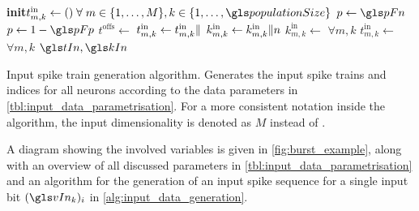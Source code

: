 \begin{algorithm}
	\small
	\begin{shaded}
		\begin{algorithmic}[1]
			\newcommand{\To}{\textbf{to}\xspace}
			\newcommand{\Init}{\State\textbf{init}\xspace}
				\Init $t^{\mathrm{in}}_{m, k} \gets () \; \forall \; m \in \{1, \ldots, M\}, k \in \{1, \ldots, \populationSize\}$
				\For{$n \gets 1$ \To $\nSamples$} 
					\For{$m \gets 1$ \To $\dimIn$} 
						 
							\State $p \gets \pFn$
						\Else
							\State $p \gets 1 - \pFp$
						\EndIf
						\For{$k \gets 1$ \To $\populationSize$} 
							\State $t^\mathrm{offs} \gets $  
							\For{$\ell \gets 1$ \To $\burstSizeIn$} 
								\If{\Call{RandomSelect}{$[0, 1)$}$ \geq p$}
									\State $t^{\mathrm{in}}_{m, k} \gets t^{\mathrm{in}}_{m, k} \Arrowvert $ 
									\State $k^{\mathrm{in}}_{m, k} \gets k^{\mathrm{in}}_{m, k} \Arrowvert n$
								\EndIf
							\EndFor
						\EndFor
					\EndFor
				\EndFor
				\State $k^{\mathrm{in}}_{m, k} \gets$  $\forall m, k$ 
				\State $t^{\mathrm{in}}_{m, k} \gets$  $\forall m, k$ 
				\State \Return $\tIn, \kIn$
			\EndFunction
		\end{algorithmic}
	\end{shaded}
	\caption[Input burst generation algorithm]{Input spike train generation algorithm. Generates the input spike trains \tIn and indices \kIn for all neurons according to the data parameters in \cref{tbl:input_data_parametrisation}. For a more consistent notation inside the algorithm, the input dimensionality is denoted as $M$ instead of \dimIn.}
	\label{alg:input_data_generation}
\end{algorithm}
A diagram showing the involved variables is given in \cref{fig:burst_example}, along with an overview of all discussed parameters in \cref{tbl:input_data_parametrisation} and an algorithm for the generation of an input spike sequence for a single input bit $(\vIn_k)_i$ in \cref{alg:input_data_generation}.

